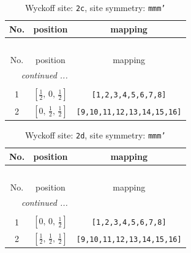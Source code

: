 \documentclass[fleqn,8pt]{jsarticle}
\begin{document}
\renewcommand{\arraystretch}{1.2}
\begin{longtable}{ccc}
\caption{Wyckoff site: {\tt 2c}, site symmetry: {\tt mmm'}}
 \\
 \hline \hline
No. & position & mapping \\ \hline \endfirsthead

\multicolumn{2}{l}{\tablename\ \thetable{}} \\
 \hline \hline
No. & position & mapping \\ \hline \endhead

 \hline \hline
\multicolumn{2}{r}{\footnotesize\it continued ...} \\ \endfoot

 \hline \hline
\multicolumn{2}{r}{} \\ \endlastfoot

1 & $\left[ \frac{1}{2},\, 0,\, \frac{1}{2} \right]$ & {\tt [1,2,3,4,5,6,7,8]} \\ \hline
2 & $\left[ 0,\, \frac{1}{2},\, \frac{1}{2} \right]$ & {\tt [9,10,11,12,13,14,15,16]} \\
\end{longtable}
\renewcommand{\arraystretch}{1.2}
\begin{longtable}{ccc}
\caption{Wyckoff site: {\tt 2d}, site symmetry: {\tt mmm'}}
 \\
 \hline \hline
No. & position & mapping \\ \hline \endfirsthead

\multicolumn{2}{l}{\tablename\ \thetable{}} \\
 \hline \hline
No. & position & mapping \\ \hline \endhead

 \hline \hline
\multicolumn{2}{r}{\footnotesize\it continued ...} \\ \endfoot

 \hline \hline
\multicolumn{2}{r}{} \\ \endlastfoot

1 & $\left[ 0,\, 0,\, \frac{1}{2} \right]$ & {\tt [1,2,3,4,5,6,7,8]} \\ \hline
2 & $\left[ \frac{1}{2},\, \frac{1}{2},\, \frac{1}{2} \right]$ & {\tt [9,10,11,12,13,14,15,16]} \\
\end{longtable}
\renewcommand{\arraystretch}{1.2}
\end{document}
